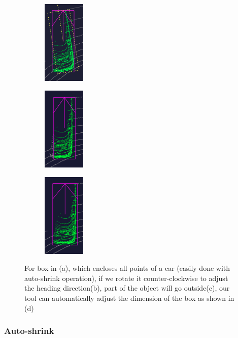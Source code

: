 \documentclass[letterpaper, 10 pt, conference]{ieeeconf}  %
\begin{document}
\begin{figure}[t]
\begin{subfigure}[t]{0.2\linewidth}
	\end{subfigure}\hfill
	\begin{subfigure}[t]{0.2\linewidth}
		\includegraphics[height=4cm]{./figures/adjust-naively}
		\caption{}
		\label{fig:box-rotate-in-subview}
	\end{subfigure}\hfill
	\begin{subfigure}[t]{0.2\linewidth}
		\includegraphics[height=4cm]{./figures/rotate-fail}
		\caption{}
	\end{subfigure}\hfill
	\begin{subfigure}[t]{0.2\linewidth}
		\includegraphics[height=4cm]{./figures/rotate-success}
		\caption{}
	\end{subfigure}\hfill
	\caption{For box in (a), which encloses all points of a car (easily done with auto-shrink operation), if we rotate it counter-clockwise to adjust the heading direction(b), part of the object will go outside(c), our tool can automatically adjust the dimension of the box as shown in (d)}
	\label{fig:boundary-aware-rotation}
\vspace{-0.3cm}
\end{figure}


\subsubsection{Auto-shrink}
\end{document}
